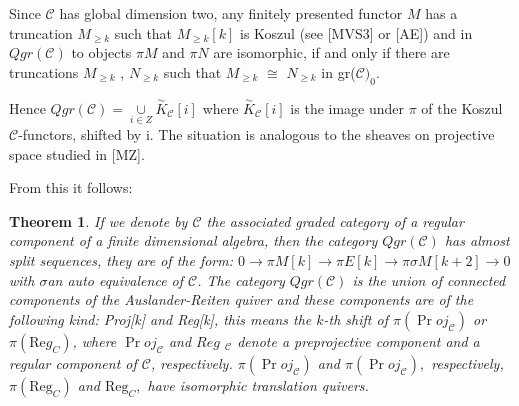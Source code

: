 \documentclass{amsart}
\newtheorem{theorem}{Theorem}
\theoremstyle{plain}
\numberwithin{equation}{section}
\begin{document}
Since $\mathcal{C}$ has global dimension two, any finitely presented functor
$M$ has a truncation $M_{\geq k}$ such that $M_{\geq k}[k]$ is Koszul (see
[MVS3] or [AE]) and in $Qgr(\mathcal{C})$ to objects $\pi M$ and $\pi N$ are
isomorphic, if and only if there are truncations $M_{\geq k}$ , $N_{\geq k}$
such that $M_{\geq k}$ $\cong $ $N_{\geq k}$ in gr($\mathcal{C)}_{0}$.

Hence $Qgr(\mathcal{C})=\underset{i\in Z}{\cup }\overset{\sim }{K}_{\mathcal{C}}[i]$ where $\overset{\sim }{K}_{\mathcal{C}}[i]$ is the image under $\pi $
of the Koszul $\mathcal{C}$-functors, shifted by i. The situation is
analogous to the sheaves on projective space studied in [MZ].

From this it follows:

\begin{theorem}
If we denote by $\mathcal{C}$ the associated graded category of a regular
component of a finite dimensional algebra, then the category $Qgr(\mathcal{C})$ has almost split sequences, they are of the form: $0\rightarrow \pi
M[k]\rightarrow \pi E[k]\rightarrow \pi \sigma M[k+2]\rightarrow 0$ with $\sigma $an auto equivalence of $\mathcal{C}$. The category $Qgr(\mathcal{C})$
is the union of connected components of the Auslander-Reiten quiver and
these components are of the following kind: Proj[k] and Reg[k], this means
the $k$-th shift of $\pi (\Pr oj_{\mathcal{C}})$ or $\pi (\mathrm{Re}g_{C})$, where $\Pr oj_{\mathcal{C}}$ and $Reg$ $_{\mathcal{C}}$ denote a
preprojective component and a regular component of $\mathcal{C}$,
respectively. $\pi (\Pr oj_{\mathcal{C}})$ and $\pi (\Pr oj_{\mathcal{C}}),$
respectively, $\pi (\mathrm{Reg}_{C})$ and $\mathrm{Reg}_{C},$ have
isomorphic translation quivers.
\end{theorem}
\end{document}
